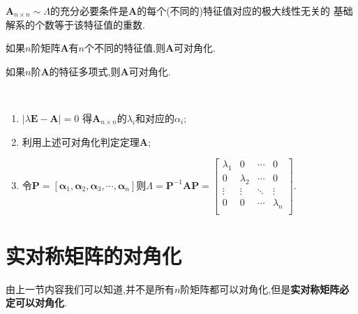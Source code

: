 \documentclass[9pt,a4paper]{book}
\begin{document}
\begin{theorem}[可对角化判据第三充分必要条件]
$ \bm{A}_{n\times n}\sim \bm{\varLambda} $的充分必要条件是$ \bm{A}$的每个(不同的)特征值对应的极大线性无关的
基础解系的个数等于该特征值的重数.
\end{theorem}
\begin{theorem}[可对角化判据第一充分条件]
	如果$ n $阶矩阵$ \bm{A}$有$ n $个不同的特征值,则$ \bm{A}$可对角化.
\end{theorem}
\begin{theorem}[可对角化判据第二充分条件]
	如果$ n $阶$ \bm{A}$的特征多项式,则$ \bm{A}$可对角化.
\end{theorem}
\begin{method}[求可逆矩阵与对角化矩阵的方法]
	\ \\
	\begin{enumerate}
		\item {}$ |\lambda\bm{E}-\bm{A}|=0 $
		得$ \bm{A}_{n\times n} $的$ \lambda_i $和对应的$\alpha_i $;
		\item 利用上述可对角化判定定理$ \bm{A} $;
		\item 令$ \bm{P}=[\bm{\alpha}_{1},\bm{\alpha}_{2},\bm{\alpha}_{3},\cdots,\bm{\alpha}_{n}] $则$ \bm{\varLambda}=\bm{P}^{-1}\bm{A}\bm{P}=	\begin{bmatrix}
		\lambda_1&0         &\cdots &0 \\
		0        & \lambda_2&\cdots &0\\
		\vdots   & \vdots   & \ddots&\vdots \\
		0        & 0        &\cdots & \lambda_n\\
		\end{bmatrix} $.
	\end{enumerate}
\end{method}


\section{实对称矩阵的对角化}
由上一节内容我们可以知道,并不是所有$ n $阶矩阵都可以对角化,但是\textbf{实对称矩阵必定可以对角化}.
\end{document}
